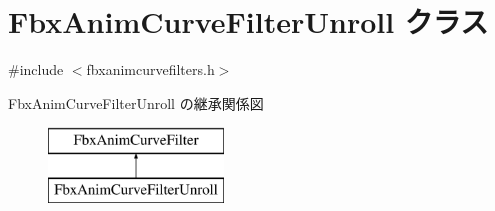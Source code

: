 \hypertarget{class_fbx_anim_curve_filter_unroll}{}\section{Fbx\+Anim\+Curve\+Filter\+Unroll クラス}
\label{class_fbx_anim_curve_filter_unroll}


{\ttfamily \#include $<$fbxanimcurvefilters.\+h$>$}

Fbx\+Anim\+Curve\+Filter\+Unroll の継承関係図\begin{figure}[H]
\begin{center}
\leavevmode
\includegraphics[height=2.000000cm]{class_fbx_anim_curve_filter_unroll}
\end{center}
\end{figure}
